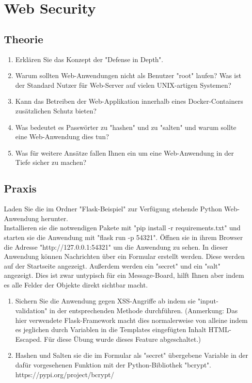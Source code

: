 \documentclass[ngerman]{article}
\begin{document}
\section{Web Security}

\subsection{Theorie}
\begin{enumerate}
    \item Erklären Sie das Konzept der "Defense in Depth".
    \item Warum sollten Web-Anwendungen nicht als Benutzer "root" laufen? Was ist der Standard Nutzer für Web-Server auf vielen UNIX-artigen Systemen?
    \item Kann das Betreiben der Web-Applikation innerhalb eines Docker-Containers zusätzlichen Schutz bieten?
    \item Was bedeutet es Passwörter zu "hashen" und zu "salten" und warum sollte eine Web-Anwendung dies tun?
    \item Was für weitere Ansätze fallen Ihnen ein um eine Web-Anwendung in der Tiefe sicher zu machen?
\end{enumerate}

\subsection{Praxis}
Laden Sie die im Ordner "Flask-Beispiel" zur Verfügung stehende Python Web-Anwendung herunter. \\
Installieren sie die notwendigen Pakete mit "pip install -r requirements.txt" und starten sie die Anwendung mit "flask run -p 54321". Öffnen sie in ihrem Browser die Adresse "http://127.0.0.1:54321" um die Anwendung zu sehen.
In dieser Anwendung können Nachrichten über ein Formular erstellt werden. Diese werden auf der Startseite angezeigt. Außerdem werden ein "secret" und ein "salt" angezeigt. Dies ist zwar untypisch für ein Message-Board, hilft Ihnen aber indem es alle Felder der Objekte direkt sichtbar macht.

\begin{enumerate}
    \item Sichern Sie die Anwendung gegen XSS-Angriffe ab indem sie "input-validation" in der entsprechenden Methode durchführen. (Anmerkung: Das hier verwendete Flask-Framework macht dies normalerweise von alleine indem es jeglichen durch Variablen in die Templates eingefügten Inhalt HTML-Escaped. Für diese Übung wurde dieses Feature abgeschaltet.)
    \item Hashen und Salten sie die im Formular als "secret" übergebene Variable in der dafür vorgesehenen Funktion mit der Python-Bibliothek "bcrypt". https://pypi.org/project/bcrypt/
\end{enumerate}
\end{document}
